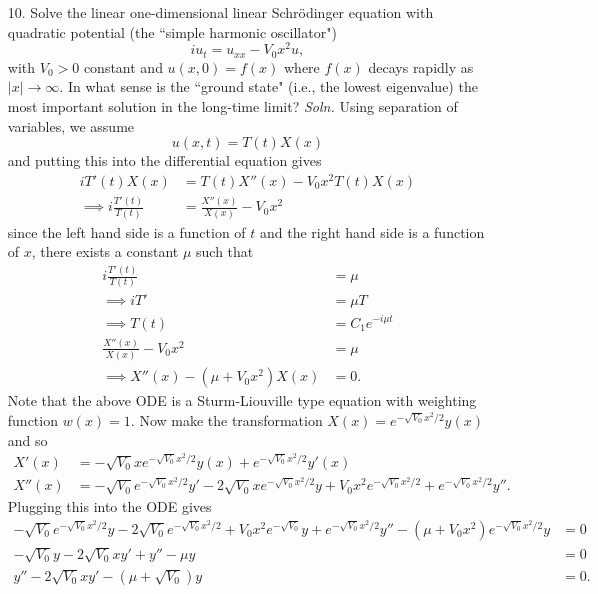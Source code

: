 \documentclass{article}
\begin{document}
\begin{itemize}
    \item[10.] Solve the linear one-dimensional linear Schr{\"o}dinger equation with quadratic potential (the ``simple harmonic oscillator")
    \[iu_t = u_{xx} - V_0x^2u,\]
    with $V_0 > 0$ constant and $u(x,0) = f(x)$ where $f(x)$ decays rapidly as $|x| \to \infty$. In what sense is the ``ground state" (i.e., the lowest eigenvalue) the most important solution in the long-time limit?
    \newline\newline
    \textit{Soln.} Using separation of variables, we assume
    \[u(x,t) = T(t)X(x)\]
    and putting this into the differential equation gives
    \begin{align*}
        iT'(t)X(x) &= T(t)X''(x) - V_0x^2T(t)X(x)\\
        \implies i\frac{T'(t)}{T(t)} &= \frac{X''(x)}{X(x)} - V_0x^2
    \end{align*}
    since the left hand side is a function of $t$ and the right hand side is a function of $x$, there exists a constant $\mu$ such that
    \begin{align*}
        i\frac{T'(t)}{T(t)} &= \mu\\
        \implies iT' &= \mu T\\
        \implies T(t) &= C_1e^{-i\mu t}\\
        \frac{X''(x)}{X(x)} -V_0x^2 &= \mu\\
        \implies X''(x) - (\mu + V_0x^2)X(x) &= 0.
    \end{align*}
    Note that the above ODE is a Sturm-Liouville type equation with weighting function $w(x) = 1$. Now make the transformation $X(x) = e^{-\sqrt{V_0}x^2/2}y(x)$ and so 
    \begin{align*}
        X'(x) &= -\sqrt{V_0}xe^{-\sqrt{V_0}x^2/2}y(x) + e^{-\sqrt{V_0}x^2/2}y'(x)\\
        X''(x) &= -\sqrt{V_0}e^{-\sqrt{V_0}x^2/2}y' - 2\sqrt{V_0}xe^{-\sqrt{V_0}x^2/2}y + V_0x^2e^{-\sqrt{V_0}x^2/2} + e^{-\sqrt{V_0}x^2/2}y''.
    \end{align*}
    Plugging this into the ODE gives
    \begin{align*}
        -\sqrt{V_0}e^{-\sqrt{V_0}x^2/2}y - 2\sqrt{V_0}e^{-\sqrt{V_0}x^2/2} + V_0x^2 e^{-\sqrt{V_0}}y + e^{-\sqrt{V_0}x^2/2}y'' - (\mu + V_0x^2)e^{-\sqrt{V_0}x^2/2}y &= 0\\
        -\sqrt{V_0}y - 2\sqrt{V_0}xy' + y'' - \mu y &= 0\\
        y'' - 2\sqrt{V_0}xy' - (\mu + \sqrt{V_0})y &= 0.
    \end{align*}

\end{itemize}
\end{document}
